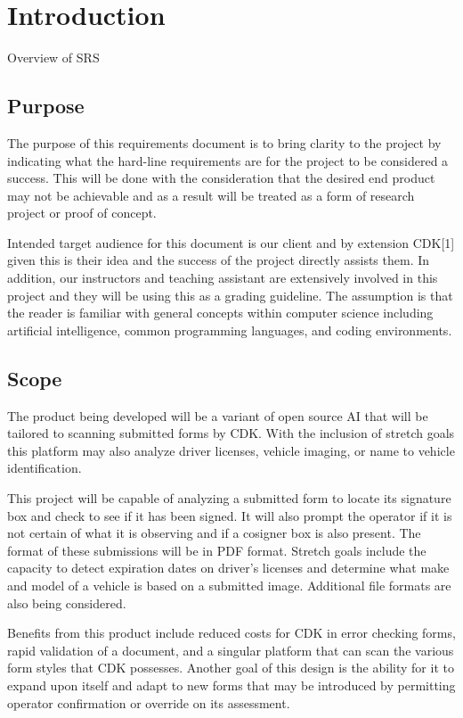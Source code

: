 \documentclass[onecolumn, draftclsnofoot,10pt, compsoc]{IEEEtran}
\begin{document}
\newpage
{}
\tableofcontents
\clearpage

\section{Introduction}
Overview of SRS

\subsection{Purpose}
The purpose of this requirements document is to bring clarity to the project by indicating what the hard-line requirements are for the project to be considered a success. This will be done with the consideration that the desired end product may not be achievable and as a result will be treated as a form of research project or proof of concept.

Intended target audience for this document is our client and by extension CDK[1] given this is their idea and the success of the project directly assists them. In addition, our instructors and teaching assistant are extensively involved in this project and they will be using this as a grading guideline. The assumption is that the reader is familiar with general concepts within computer science including artificial intelligence, common programming languages, and coding environments.


\subsection{Scope}
The product being developed will be a variant of open source AI that will be tailored to scanning submitted forms by CDK. With the inclusion of stretch goals this platform may also analyze driver licenses, vehicle imaging, or name to vehicle identification. 

This project will be capable of analyzing a submitted form to locate its signature box and check to see if it has been signed. It will also prompt the operator if it is not certain of what it is observing and if a cosigner box is also present. The format of these submissions will be in PDF format. Stretch goals include the capacity to detect expiration dates on driver’s licenses and determine what make and model of a vehicle is based on a submitted image. Additional file formats are also being considered.

Benefits from this product include reduced costs for CDK in error checking forms, rapid validation of a document, and a singular platform that can scan the various form styles that CDK possesses. Another goal of this design is the ability for it to expand upon itself and adapt to new forms that may be introduced by permitting operator confirmation or override on its assessment. 
\end{document}
